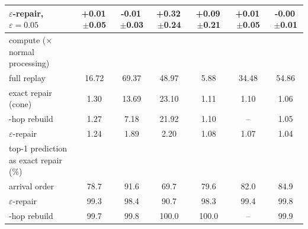 \begin{table}[t]
\begin{tabular}{@{}lcccccc@{}}
\quad $\varepsilon$-repair, $\varepsilon=0.05$ & +0.01\,{\scriptsize$\pm$0.05} & -0.01\,{\scriptsize$\pm$0.03} & +0.32\,{\scriptsize$\pm$0.24} & +0.09\,{\scriptsize$\pm$0.21} & +0.01\,{\scriptsize$\pm$0.05} & -0.00\,{\scriptsize$\pm$0.01} \\
\midrule
compute ($\times$ normal processing) &  &  &  &  &  &  \\
\quad full replay & 16.72 & 69.37 & 48.97 & 5.88 & 34.48 & 54.86 \\
\quad exact repair (cone) & 1.30 & 13.69 & 23.10 & 1.11 & 1.10 & 1.06 \\
\quad 1-hop rebuild & 1.27 & 7.18 & 21.92 & 1.10 & -- & 1.05 \\
\quad $\varepsilon$-repair & 1.24 & 1.89 & 2.20 & 1.08 & 1.07 & 1.04 \\
\midrule
top-1 prediction as exact repair (\%) &  &  &  &  &  &  \\
\quad arrival order & 78.7 & 91.6 & 69.7 & 79.6 & 82.0 & 84.9 \\
\quad $\varepsilon$-repair & 99.3 & 98.4 & 90.7 & 98.3 & 99.4 & 99.8 \\
\quad 1-hop rebuild & 99.7 & 99.8 & 100.0 & 100.0 & -- & 99.9 \\
\bottomrule
\end{tabular}
\end{table}

